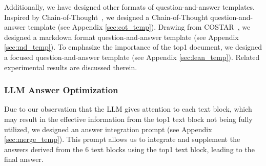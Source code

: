 \documentclass[11pt]{article}
\begin{document}
Additionally, we have designed other formats of question-and-answer templates. Inspired by Chain-of-Thought~\cite{wei2022chain}, we designed a Chain-of-Thought question-and-answer template (see Appendix \ref{sec:cot_temp}). Drawing from COSTAR~\cite{costar}, we designed a markdown format question-and-answer template (see Appendix \ref{sec:md_temp}). To emphasize the importance of the top1 document, we designed a focused question-and-answer template (see Appendix \ref{sec:lean_temp}). Related experimental results are discussed therein.

\subsubsection{LLM Answer Optimization}
Due to our observation that the LLM gives attention to each text block, which may result in the effective information from the top1 text block not being fully utilized, we designed an answer integration prompt (see Appendix \ref{sec:merge_temp}). This prompt allows us to integrate and supplement the answers derived from the 6 text blocks using the top1 text block, leading to the final answer.
\end{document}
